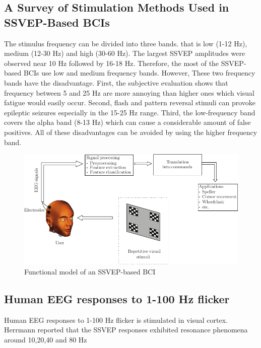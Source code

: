 \subsection {A Survey of Stimulation Methods Used in SSVEP-Based BCIs\cite{ref7}}

\hspace{1.5cm} The stimulus frequency can be divided into three bands. that is low (1-12 Hz), medium (12-30 Hz) and high (30-60 Hz). The largest SSVEP amplitudes were observed near 10 Hz followed by 16-18 Hz. Therefore, the most of the SSVEP-based BCIs use low and medium frequency bands. However, These two frequency bands have the disadvantage. First, the subjective evaluation shows that frequency between 5 and 25 Hz are more annoying than higher ones which visual fatigue would easily occur. Second, flash and pattern reversal stimuli can provoke epileptic seizures especially in the 15-25 Hz range. Third, the low-frequency band covers the alpha band (8-13 Hz) which can cause a considerable amount of false positives. All of these disadvantages can be avoided by using the higher frequency band.  

\begin{figure}[ht]
	\centering
	\includegraphics[scale = 1.2]{chapter2/210.pdf}
	\caption{ Functional model of an SSVEP-based BCI}
\end{figure}  

\newpage
\subsection {Human EEG responses to 1-100 Hz flicker\cite{ref8}}

\hspace{1.5cm} Human EEG responses to 1-100 Hz flicker is stimulated in visual cortex. Herrmann reported that the SSVEP responses exhibited resonance phenomena around 10,20,40 and 80 Hz


